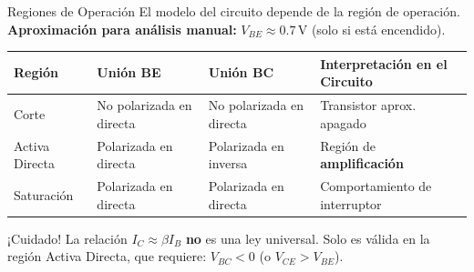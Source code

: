\documentclass[aspectratio=169, table, xcdraw]{beamer}
\begin{document}
\begin{frame}{Regiones de Operación}
    El modelo del circuito depende de la región de operación. 
    \textbf{Aproximación para análisis manual:} $V_{BE} \approx 0.7\,\text{V}$ (solo si está encendido).
    
    \vspace{0.2cm}
    \begin{table}[]
        \centering
        \small
        \renewcommand{\arraystretch}{1.3}
        \begin{tabularx}{\textwidth}{|l|X|X|X|}
        \hline
        \rowcolor{ucbblue!20} 
        \textbf{Región} & \textbf{Unión BE} & \textbf{Unión BC} & \textbf{Interpretación en el Circuito} \\ \hline
        Corte & No polarizada en directa & No polarizada en directa & Transistor aprox. apagado \\ \hline
        Activa Directa & Polarizada en directa & Polarizada en inversa & Región de \textbf{amplificación} \\ \hline
        Saturación & Polarizada en directa & Polarizada en directa & Comportamiento de interruptor \\ \hline
        \end{tabularx}
    \end{table}

    \begin{alertblock}{¡Cuidado!}
        La relación $I_C \approx \beta I_B$ \textbf{no} es una ley universal. Solo es válida en la región Activa Directa, que requiere: $V_{BC} < 0$ (o $V_{CE} > V_{BE}$).
    \end{alertblock}
\end{frame}
\end{document}
